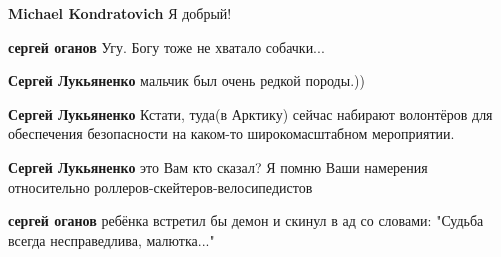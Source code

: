 \begin{itemize}
\begin{itemize}
 
\textbf{Michael Kondratovich} Я добрый!

 
\textbf{сергей оганов} Угу. Богу тоже не хватало собачки...

 
\textbf{Сергей Лукьяненко} мальчик был очень редкой породы.))

 
\textbf{Сергей Лукьяненко} Кстати, туда(в Арктику) сейчас набирают волонтёров для обеспечения безопасности на каком-то широкомасштабном мероприятии.

 
\textbf{Сергей Лукьяненко} это Вам кто сказал? Я помню Ваши намерения относительно роллеров-скейтеров-велосипедистов 🤣

 
\textbf{сергей оганов} ребёнка встретил бы демон и скинул в ад со словами: "Судьба всегда несправедлива, малютка..."
\end{itemize}


\end{itemize}
